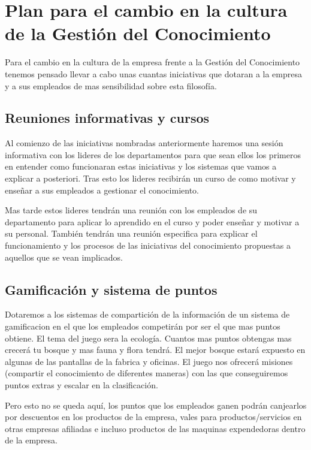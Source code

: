 \documentclass[twoside]{article}
\begin{document}

\section{Plan para el cambio en la cultura de la Gestión del Conocimiento}

Para el cambio en la cultura de la empresa frente a la Gestión del Conocimiento tenemos pensado llevar a cabo unas cuantas iniciativas que dotaran a la empresa y a sus empleados de mas sensibilidad sobre esta filosofía.

\subsection{Reuniones informativas y cursos}

Al comienzo de las iniciativas nombradas anteriormente haremos una sesión informativa con los lideres de los departamentos para que sean ellos los primeros en entender como funcionaran estas iniciativas y los sistemas que vamos a explicar a posteriori. Tras esto los lideres recibirán un curso de como motivar y enseñar a sus empleados a gestionar el conocimiento. \par
Mas tarde estos lideres tendrán una reunión con los empleados de su departamento para aplicar lo aprendido en el curso y poder enseñar y motivar a su personal. También tendrán una reunión especifica para explicar el funcionamiento y los procesos de las iniciativas del conocimiento propuestas a aquellos que se vean implicados.

\subsection{Gamificación y sistema de puntos}

Dotaremos a los sistemas de compartición de la información de un sistema de gamificacion en el que los empleados competirán por ser el que mas puntos obtiene. El tema del juego sera la ecología. Cuantos mas puntos obtengas mas crecerá tu bosque y mas fauna y flora tendrá. El mejor bosque estará expuesto en algunas de las pantallas de la fabrica y oficinas. El juego nos ofrecerá misiones (compartir el conocimiento de diferentes maneras) con las que conseguiremos puntos extras y escalar en la clasificación.\par
Pero esto no se queda aquí, los puntos que los empleados ganen podrán canjearlos por descuentos en los productos de la empresa,  vales para productos/servicios en otras empresas afiliadas e incluso productos de las maquinas expendedoras dentro de la empresa.
\end{document}
